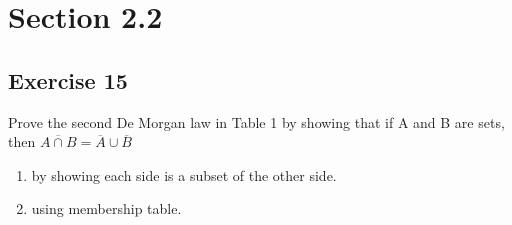\documentclass{article}
\theoremstyle{mytheoremstyle}
\theoremstyle{mytheoremstyle}
\theoremstyle{myproblemstyle}
\begin{document}
    \section*{Section 2.2}
    \subsection*{Exercise 15}
        Prove the second De Morgan law in Table 1 by showing that if A and B are sets, then \(\overline{A \cap B} = \overline{A} \cup \overline{B}\)
        \begin{enumerate} [label = (\alph*)]
            \item by showing each side is a subset of the other side.
            \item using membership table.
        \end{enumerate}
\end{document}
